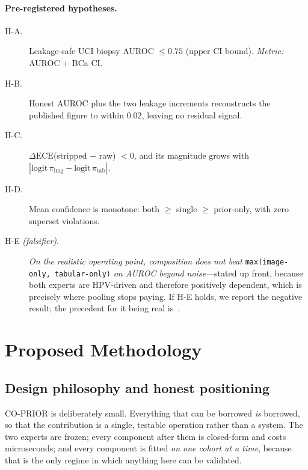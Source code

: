 \documentclass[sigplan,nonacm,screen]{acmart}
\begin{document}
\paragraph{Pre-registered hypotheses.}
\begin{description}
  \item[H-A.] Leakage-safe UCI biopsy AUROC $\le 0.75$ (upper CI bound). \emph{Metric:} AUROC + BCa CI.
  \item[H-B.] Honest AUROC plus the two leakage increments reconstructs the published figure to within $0.02$, leaving no residual signal.
  \item[H-C.] $\Delta\mathrm{ECE}$(stripped $-$ raw) $<0$, and its magnitude grows with $|\mathrm{logit}\,\pi_{\mathrm{img}}-\mathrm{logit}\,\pi_{\mathrm{tab}}|$.
  \item[H-D.] Mean confidence is monotone: both $\ge$ single $\ge$ prior-only, with zero superset violations.
  \item[H-E \emph{(falsifier)}.] \emph{On the realistic operating point, composition does \emph{not} beat} \texttt{max(image-only, tabular-only)} \emph{on AUROC beyond noise}---stated up front, because both experts are HPV-driven and therefore positively dependent, which is precisely where pooling stops paying. If H-E holds, we report the negative result; the precedent for it being real is~\cite{kelebet2025multimodal}.
\end{description}

\section{Proposed Methodology}

\subsection{Design philosophy and honest positioning}

CO-PRIOR is deliberately small. Everything that can be borrowed \emph{is} borrowed, so that the contribution is a single, testable operation rather than a system. The two experts are frozen; every component after them is closed-form and costs microseconds; and every component is fitted \emph{on one cohort at a time}, because that is the only regime in which anything here can be validated.
\end{document}

